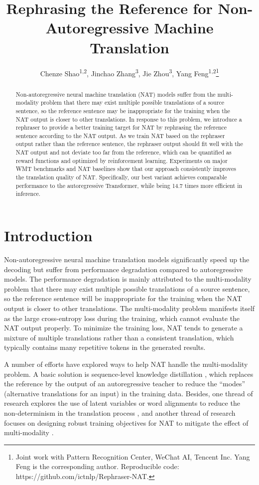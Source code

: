 \documentclass[letterpaper]{article} %
\title{Rephrasing the Reference for Non-Autoregressive Machine Translation}
\author{Chenze Shao\textsuperscript{\rm{1,2}}, Jinchao Zhang\textsuperscript{\rm{3}}, Jie Zhou\textsuperscript{\rm{3}}, Yang Feng\textsuperscript{\rm{1,2}}\thanks{Joint work with Pattern Recognition Center, WeChat AI, Tencent Inc. Yang Feng is the corresponding author. Reproducible code: https://github.com/ictnlp/Rephraser-NAT.}}
\begin{document}
\maketitle
\begin{abstract}
Non-autoregressive neural machine translation (NAT) models suffer from the multi-modality problem that there may exist multiple possible translations of a source sentence, so the reference sentence may be inappropriate for the training when the NAT output is closer to other translations. In response to this problem, we introduce a rephraser to provide a better training target for NAT by rephrasing the reference sentence according to the NAT output. As we train NAT based on the rephraser output rather than the reference sentence, the rephraser output should fit well with the NAT output and not deviate too far from the reference, which can be quantified as reward functions and optimized by reinforcement learning. Experiments on major WMT benchmarks and NAT baselines show that our approach consistently improves the translation quality of NAT. Specifically, our best variant achieves comparable performance to the autoregressive Transformer, while being 14.7 times more efficient in inference.
\end{abstract}

\section{Introduction}
Non-autoregressive neural machine translation \citep[NAT,][]{gu2017non} models significantly speed up the decoding but suffer from performance degradation compared to autoregressive models. The performance degradation is mainly attributed to the multi-modality problem that there may exist multiple possible translations of a source sentence, so the reference sentence will be inappropriate for the training when the NAT output is closer to other translations. The multi-modality problem manifests itself as the large cross-entropy loss during the training, which cannot evaluate the NAT output properly. To minimize the training loss, NAT tends to generate a mixture of multiple translations rather than a consistent translation, which typically contains many repetitive tokens in the generated results.

A number of efforts have explored ways to help NAT handle the multi-modality problem. A basic solution is sequence-level knowledge distillation \cite{kim-rush-2016-sequence,Zhou2020Understanding}, which replaces the reference by the output of an autoregressive teacher to reduce the ``modes'' (alternative translations for an input) in the training data. Besides, one thread of research explores the use of latent variables or word alignments to reduce the non-determinism in the translation process \cite{gu2017trainable,Ma_2019,Shu2020LatentVariableNN,song-etal-2021-alignart}, and another thread of research focuses on designing robust training objectives for NAT to mitigate the effect of multi-modality \cite{libovicky2018end,DBLP:conf/aaai/ShaoZFMZ20,Aligned,DBLP:conf/icml/DuTJ21}.
\end{document}
